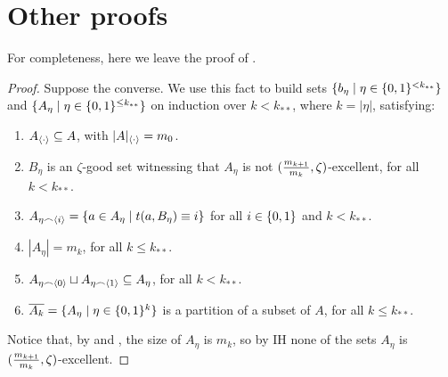 \appendix

\vfill\newpage \section{Other proofs} \label{sec:appendix_other_proofs}

    For completeness, here we leave the proof of .

    \begin{proof}
        Suppose the converse.
        We use this fact to build sets $\{ b_\eta \mid \eta \in \{ 0,1 \}^{<k_{**}} \}$ and
        $\{ A_\eta \mid \eta \in \{ 0,1 \}^{\leq k_{**}} \}$ on induction over $k<k_{**}$, where $k = |\eta|$,
        satisfying:
        \begin{enumerate}
            \item\label{itm:existance_of_excellent_subsets_fixed_size_choices.1} $A_{\left< \cdot \right>} \subseteq A$, with $|A|_{\left< \cdot \right>} = m_0$.
            \item\label{itm:existance_of_excellent_subsets_fixed_size_choices.2} $B_\eta$ is an $\zeta$-good set witnessing that $A_\eta$ is not
                $( \frac{m_{k+1}}{m_{k}}, \zeta )$-excellent, for all $k < k_{**}$.
            \item\label{itm:existance_of_excellent_subsets_fixed_size_choices.3} $A_{\eta \frown \left< i \right>} = \{ a \in A_\eta \mid t(a, B_\eta) \equiv i \}$
                for all $i \in \{ 0,1 \}$ and $k < k_{**}$.
            \item\label{itm:existance_of_excellent_subsets_fixed_size_choices.4} $|A_{\eta}| = m_k$, for all $k \leq k_{**}$.
            \item\label{itm:existance_of_excellent_subsets_fixed_size_choices.6} $A_{\eta \frown \left< 0 \right>} \sqcup A_{\eta \frown \left< 1 \right>} \subseteq A_\eta$,
                for all $k < k_{**}$.
            \item\label{itm:existance_of_excellent_subsets_fixed_size_choices.7} $\overline{A_k} = \{ A_\eta \mid \eta \in \{ 0,1 \}^k \}$ is a partition of
                a subset of $A$, for all $k \leq k_{**}$.
        \end{enumerate}
        Notice that, by  and
        , the size of $A_\eta$ is $m_k$,
        so by IH none of the sets $A_\eta$ is $( \frac{m_{k+1}}{m_{k}}, \zeta )$-excellent.

\end{proof}
